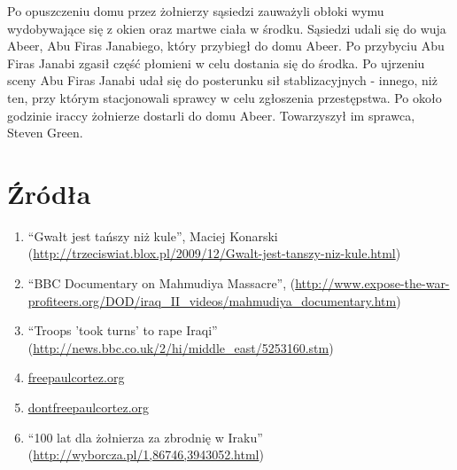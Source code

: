 \documentclass[12pt,a4paper]{article}
\begin{document}
Po opuszczeniu domu przez żołnierzy sąsiedzi zauważyli obłoki wymu
wydobywające się z okien oraz martwe ciała w środku. Sąsiedzi udali
się do wuja Abeer, Abu Firas Janabiego, który przybiegł do domu Abeer.
Po przybyciu Abu Firas Janabi zgasił część płomieni w celu dostania
się do środka. Po ujrzeniu sceny Abu Firas Janabi udał się do
posterunku sił stablizacyjnych - innego, niż ten, przy którym
stacjonowali sprawcy w celu zgłoszenia przestępstwa. Po około godzinie
iraccy żołnierze dostarli do domu Abeer. Towarzyszył im sprawca,
Steven Green.


\section{Źródła}

\begin{enumerate}
\item ``Gwałt jest tańszy niż kule'', Maciej Konarski (\url{http://trzeciswiat.blox.pl/2009/12/Gwalt-jest-tanszy-niz-kule.html})
\item ``BBC Documentary on Mahmudiya Massacre'',
  (\url{http://www.expose-the-war-profiteers.org/DOD/iraq_II_videos/mahmudiya_documentary.htm})
\item ``Troops 'took turns' to rape Iraqi'' (\url{http://news.bbc.co.uk/2/hi/middle_east/5253160.stm})
\item \url{freepaulcortez.org}
\item \url{dontfreepaulcortez.org}
\item ``100 lat dla żołnierza za zbrodnię w Iraku'' (\url{http://wyborcza.pl/1,86746,3943052.html})
\end{enumerate}
\end{document}
